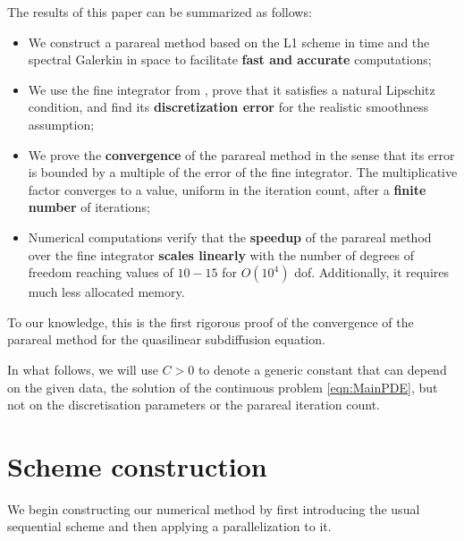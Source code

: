 \documentclass[12pt,a4paper]{article}
\begin{document}
The results of this paper can be summarized as follows:
\begin{itemize}
	\item We construct a parareal method based on the L1 scheme in time and the spectral Galerkin in space to facilitate \textbf{fast and accurate} computations;
	\item We use the fine integrator from \cite{fu2019preconditioned}, prove that it satisfies a natural Lipschitz condition, and find its \textbf{discretization error} for the realistic smoothness assumption;
	\item We prove the \textbf{convergence} of the parareal method in the sense that its error is bounded by a multiple of the error of the fine integrator. The multiplicative factor converges to a value, uniform in the iteration count, after a \textbf{finite number} of iterations;  
	\item Numerical computations verify that the \textbf{speedup} of the parareal method over the fine integrator \textbf{scales linearly} with the number of degrees of freedom reaching values of $10-15$ for $O(10^4)$ dof. Additionally, it requires much less allocated memory. 
\end{itemize}
To our knowledge, this is the first rigorous proof of the convergence of the parareal method for the quasilinear subdiffusion equation. 

In what follows, we will use $C>0$ to denote a generic constant that can depend on the given data, the solution of the continuous problem \eqref{eqn:MainPDE}, but not on the discretisation parameters or the parareal iteration count.

\section{Scheme construction}
We begin constructing our numerical method by first introducing the usual sequential scheme and then applying a parallelization to it.
\end{document}

